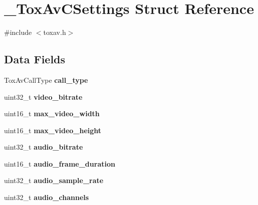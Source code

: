 \hypertarget{struct___tox_av_c_settings}{\section{\+\_\+\+Tox\+Av\+C\+Settings Struct Reference}
\label{struct___tox_av_c_settings}
}


{\ttfamily \#include $<$toxav.\+h$>$}

\subsection*{Data Fields}
\begin{DoxyCompactItemize}
\item 
\hypertarget{struct___tox_av_c_settings_af8142c751283bdc9d14609ab3009b920}{Tox\+Av\+Call\+Type {\bfseries call\+\_\+type}}\label{struct___tox_av_c_settings_af8142c751283bdc9d14609ab3009b920}

\item 
\hypertarget{struct___tox_av_c_settings_af0eac99d4181795e8a595d244e745192}{uint32\+\_\+t {\bfseries video\+\_\+bitrate}}\label{struct___tox_av_c_settings_af0eac99d4181795e8a595d244e745192}

\item 
\hypertarget{struct___tox_av_c_settings_ab81ecded1f7c46e120c8f2afa7b2c5cc}{uint16\+\_\+t {\bfseries max\+\_\+video\+\_\+width}}\label{struct___tox_av_c_settings_ab81ecded1f7c46e120c8f2afa7b2c5cc}

\item 
\hypertarget{struct___tox_av_c_settings_a4fef4b2fa1a8ae8446314ad0af4ce698}{uint16\+\_\+t {\bfseries max\+\_\+video\+\_\+height}}\label{struct___tox_av_c_settings_a4fef4b2fa1a8ae8446314ad0af4ce698}

\item 
\hypertarget{struct___tox_av_c_settings_a5d9a8b59b2eb1eef8dbdcb032bf1dd01}{uint32\+\_\+t {\bfseries audio\+\_\+bitrate}}\label{struct___tox_av_c_settings_a5d9a8b59b2eb1eef8dbdcb032bf1dd01}

\item 
\hypertarget{struct___tox_av_c_settings_a61b592233f5a65705eb2600d38e365cd}{uint16\+\_\+t {\bfseries audio\+\_\+frame\+\_\+duration}}\label{struct___tox_av_c_settings_a61b592233f5a65705eb2600d38e365cd}

\item 
\hypertarget{struct___tox_av_c_settings_a66da4482e934a2700e07a39fa0838559}{uint32\+\_\+t {\bfseries audio\+\_\+sample\+\_\+rate}}\label{struct___tox_av_c_settings_a66da4482e934a2700e07a39fa0838559}

\item 
\hypertarget{struct___tox_av_c_settings_a1b04e9669a2929f425e867440b6d826d}{uint32\+\_\+t {\bfseries audio\+\_\+channels}}\label{struct___tox_av_c_settings_a1b04e9669a2929f425e867440b6d826d}

\end{DoxyCompactItemize}


